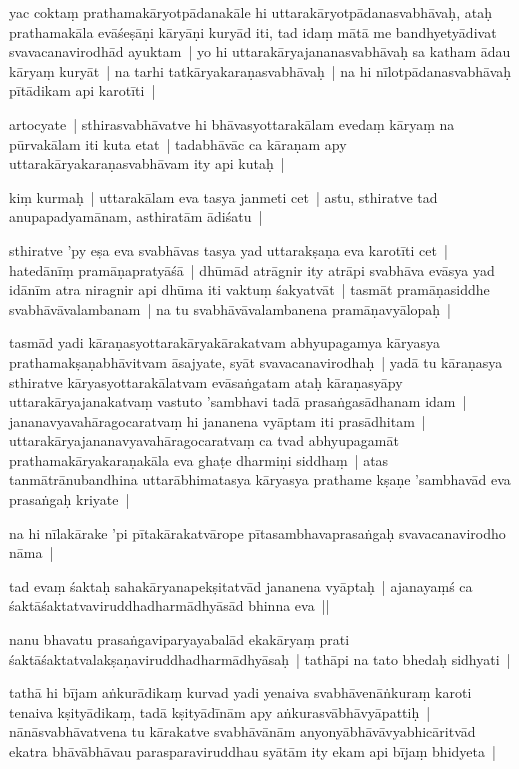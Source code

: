 \documentclass[article,12pt,a4paper]{memoir}
\begin{document}
	  \pstart yac coktaṃ prathamakāryotpādanakāle hi uttarakāryotpādanasvabhāvaḥ, ataḥ prathamakāla evāśeṣāṇi kāryāṇi kuryād iti, tad idaṃ mātā me bandhyetyādivat svavacanavirodhād ayuktam | yo hi uttarakāryajananasvabhāvaḥ sa katham ādau kāryaṃ kuryāt | na tarhi tatkāryakaraṇasvabhāvaḥ | na hi nīlotpādanasvabhāvaḥ pītādikam api karotīti |
	\pend
      

	  \pstart artocyate | sthirasvabhāvatve hi bhāvasyottarakālam evedaṃ kāryaṃ na pūrvakālam iti kuta etat | tadabhāvāc ca kāraṇam apy uttarakāryakaraṇasvabhāvam ity api kutaḥ | 
	\pend
      

	  \pstart kiṃ kurmaḥ | uttarakālam eva tasya janmeti cet | astu, sthiratve tad anupapadyamānam, asthiratām ādiśatu |
	\pend
      

	  \pstart sthiratve 'py eṣa eva svabhāvas tasya yad uttarakṣaṇa eva karotīti cet | hatedānīṃ pramāṇapratyāśā | dhūmād atrāgnir ity atrāpi svabhāva evāsya yad idānīm atra niragnir api dhūma iti vaktuṃ śakyatvāt | tasmāt pramāṇasiddhe svabhāvāvalambanam | na tu svabhāvāvalambanena pramāṇavyālopaḥ | 
	\pend
      

	  \pstart tasmād yadi kāraṇasyottarakāryakārakatvam abhyupagamya kāryasya prathamakṣaṇabhāvitvam āsajyate, syāt svavacanavirodhaḥ | yadā tu kāraṇasya sthiratve kāryasyottarakālatvam evāsaṅgatam ataḥ kāraṇasyāpy uttarakāryajanakatvaṃ vastuto 'sambhavi tadā prasaṅgasādhanam idam | jananavyavahāragocaratvaṃ hi jananena vyāptam iti prasādhitam | uttarakāryajananavyavahāragocaratvaṃ ca tvad abhyupagamāt prathamakāryakaraṇakāla eva ghaṭe dharmiṇi siddhaṃ | atas tanmātrānubandhina uttarābhimatasya kāryasya prathame kṣaṇe 'sambhavād eva prasaṅgaḥ kriyate | 
	\pend
      

	  \pstart na hi nīlakārake 'pi pītakārakatvārope pītasambhavaprasaṅgaḥ svavacanavirodho nāma | 
	\pend
      

	  \pstart tad evaṃ śaktaḥ sahakāryanapekṣitatvād jananena vyāptaḥ | ajanayaṃś ca śaktāśaktatvaviruddhadharmādhyāsād bhinna eva ||
	\pend
      

	  \pstart nanu bhavatu prasaṅgaviparyayabalād ekakāryaṃ prati śaktāśaktatvalakṣaṇaviruddhadharmādhyāsaḥ | tathāpi na tato bhedaḥ sidhyati | 
	\pend
      

	  \pstart tathā hi bījam aṅkurādikaṃ kurvad yadi yenaiva svabhāvenāṅkuraṃ karoti tenaiva kṣityādikaṃ, tadā kṣityādīnām apy aṅkurasvābhāvyāpattiḥ | nānāsvabhāvatvena tu kārakatve svabhāvānām anyonyābhāvāvyabhicāritvād ekatra bhāvābhāvau parasparaviruddhau syātām ity ekam api bījaṃ bhidyeta |
	\pend
      
\end{document}
